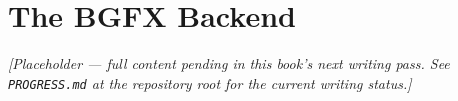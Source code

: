 \chapter{The BGFX Backend}
\label{ch:bgfx-backend}

\emph{[Placeholder --- full content pending in this book's next writing pass. See \texttt{PROGRESS.md} at the repository root for the current writing status.]}
